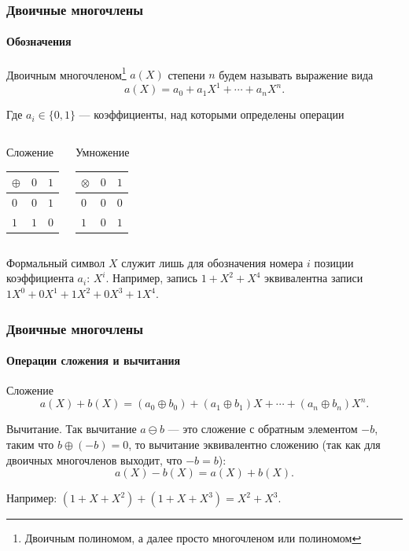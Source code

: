 \begin{frame}
    \frametitle{Двоичные многочлены}
    \framesubtitle{Обозначения}
    Двоичным \alert{многочленом}\footnote{Двоичным \alert{полиномом}, а далее просто многочленом или полиномом} $a(X)$ степени $n$ будем называть выражение вида 
    \[ a(X)=a_0+a_1X^1+\cdots +a_nX^n. \]
    
    Где $a_i\in \{0,1\}$ --- \alert{коэффициенты}, над которыми определены операции
    \begin{columns}
        \begin{block}{Сложение}
            \centering
            \begin{tabular}[c]{l|l|l|}
                $\oplus$    &$0$  &$1$ \\
                \hline
                $0$         &$0$  &$1$ \\
                \hline
                $1$         &$1$  &$0$ \\
                \hline
            \end{tabular}
        \end{block}
        
        \begin{block}{Умножение}
            \centering
            \begin{tabular}[c]{l|l|l|}
                $\otimes$   &$0$  &$1$ \\
                \hline
                $0$         &$0$  &$0$ \\
                \hline
                $1$         &$0$  &$1$ \\
                \hline
            \end{tabular}
        \end{block}
    \end{columns}
    
    \alert{Формальный символ} $X$ служит лишь для обозначения номера $i$ позиции \alert{коэффициента} $a_i$: $X^i$. Например, запись $1+X^2+X^4$ эквивалентна записи $1X^0+0X^1+1X^2+0X^3+1X^4$.
\end{frame}


\begin{frame}
    \frametitle{Двоичные многочлены}
    \framesubtitle{Операции сложения и вычитания}
    
    \alert{Сложение}
    \[a(X)+b(X)=(a_0\oplus b_0) + (a_1\oplus b_1)X + \cdots + (a_n\oplus b_n)X^n. \]
    
    \alert{Вычитание}. Так вычитание $a\ominus b$ --- это сложение с обратным элементом $-b$, таким что $b\oplus (-b)=0$, то вычитание эквивалентно сложению (так как для двоичных многочленов выходит, что $-b=b$):
    \[a(X)-b(X)=a(X)+b(X).\]
    
    Например: $(1+X+X^2)+(1+X+X^3)=X^2+X^3$.
    
\end{frame}


